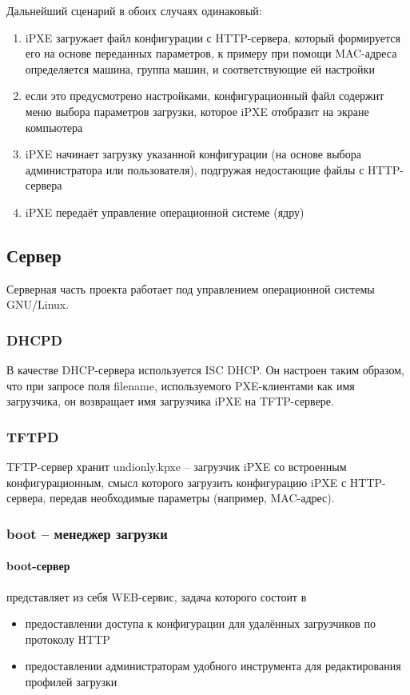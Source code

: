 \documentclass[11pt]{article}
\begin{document}
Дальнейший сценарий в обоих случаях одинаковый:
\begin{enumerate}
    \item iPXE загружает файл конфигурации с HTTP-сервера,
        который формируется его на основе переданных параметров,
        к примеру при помощи MAC-адреса определяется машина,
        группа машин, и соответствующие ей настройки
    \item если это предусмотрено настройками,
        конфигурационный файл содержит меню выбора параметров загрузки,
        которое iPXE отобразит на экране компьютера
    \item iPXE начинает загрузку указанной конфигурации (на основе выбора администратора
        или пользователя), подгружая недостающие файлы с HTTP-сервера
    \item iPXE передаёт управление операционной системе (ядру)
\end{enumerate}

\subsection{Сервер}
Серверная часть проекта работает под управлением операционной
системы GNU/Linux.

\subsubsection{DHCPD}
В качестве DHCP-сервера используется ISC DHCP.
Он настроен таким образом, что при запросе поля
filename, используемого PXE-клиентами как имя
загрузчика, он возвращает имя загрузчика iPXE
на TFTP-сервере.

\subsubsection{TFTPD}
TFTP-сервер хранит undionly.kpxe -- загрузчик iPXE
со встроенным конфигурационным, смысл которого загрузить
конфигурацию iPXE с HTTP-сервера, передав необходимые параметры
(например, MAC-адрес).

\subsubsection{boot -- менеджер загрузки}

\paragraph{boot-сервер} представляет из себя WEB-сервис, задача которого состоит в
\begin{itemize}
    \item предоставлении доступа к конфигурации для удалённых загрузчиков по протоколу HTTP
    \item предоставлении администраторам удобного инструмента для редактирования профилей загрузки
\end{itemize}
\end{document}
